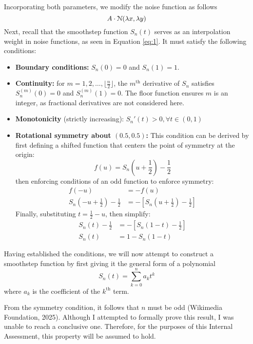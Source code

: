 Incorporating both parameters, we modify the noise function as follows
\[A\cdot\EuScript{N}(\lambda x,\lambda y)\]
Next, recall that the smoothstep function $S_n(t)$ serves as an interpolation weight in noise functions, as seen in 
Equation \ref{eq:1}. It must satisfy the following conditions:
\begin{itemize}
    \item \textbf{Boundary conditions:} $S_n(0)=0$ and $S_n(1)=1$.
    \item \textbf{Continuity:} for $m=1,2,\dots,\lfloor\frac{n}{2}\rfloor$, the $m^{\text{th}}$ derivative of $S_n$ satisfies 
    $S_n^{(m)}(0)=0$ and $S_n^{(m)}(1)=0$. The floor function ensures $m$ is an integer, as fractional derivatives are
    not considered here.
    \item \textbf{Monotonicity} (strictly increasing): $S_n'(t)>0,\forall t\in(0,1)$
    \item \textbf{Rotational symmetry about $(0.5,0.5)$:} This condition can be derived by first defining a shifted function that centers
    the point of symmetry at the origin:
    \[f(u)=S_n\left(u+\frac{1}{2}\right)-\frac{1}{2}\]
    then enforcing conditions of an odd function to enforce symmetry:
    \begin{align*}
        f(-u)&=-f(u)\\
        S_n\left(-u+\frac{1}{2}\right)-\frac{1}{2}&=-\left[S_n\left(u+\frac{1}{2}\right)-\frac{1}{2}\right]
    \end{align*}
    Finally, substituting $t=\frac{1}{2}-u$, then simplify:
    \begin{align*}
        S_n(t)-\frac{1}{2}&=-\left[S_n(1-t)-\frac{1}{2}\right]\\
        S_n(t)&=1-S_n(1-t)
    \end{align*}
\end{itemize}
Having established the conditions, we will now attempt to construct a smoothstep function by first giving it the general form of
a polynomial
\[S_n(t)=\sum_{k=0}^{n}a_kt^k\]
where $a_k$ is the coefficient of the $k^{\text{th}}$ term.

From the symmetry condition, it follows that $n$ must be odd (Wikimedia Foundation, 2025). Although I attempted to formally prove 
this result, I was unable to reach a conclusive one. Therefore, for the purposes of this Internal Assessment, this property will 
be assumed to hold.


